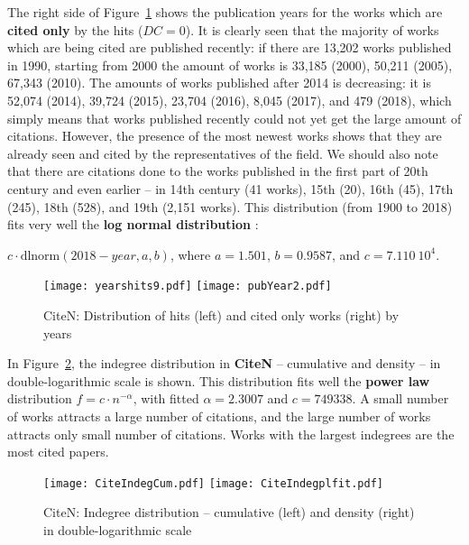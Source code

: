 \documentclass[11pt]{article} %
\begin{document}
The right side of Figure~\ref{yeard} shows the publication years for the works which are \textbf{cited only} by the hits ($DC=0$). It is clearly seen that the majority of works which are being cited are published recently: if there are 13,202 works published in 1990, starting from 2000 the amount of works is 33,185 (2000), 50,211 (2005), 67,343 (2010). The amounts of works published after 2014 is decreasing: it is 52,074 (2014), 39,724 (2015),  23,704 (2016), 8,045 (2017), and 479 (2018), which simply means that works published recently could not yet get the large amount of citations. However, the presence of the most newest works shows that they are already seen and cited by the representatives of the field. We should also note that there are citations done to the works published in the first part of 20th century and even earlier -- in 14th century (41 works), 15th (20), 16th (45), 17th (245), 18th (528), and 19th (2,151 works). This distribution (from 1900 to 2018) fits very well the \textbf{log normal distribution} \cite[p.~119--121]{Understand}: \smallskip 

$c\cdot \mbox{dlnorm}(2018-year,a,b)$, where $a = 1.501$, $b = 0.9587$, and $c = 7.110\ 10^4$.\medskip

\begin{figure}
\centerline{
\texttt{[image: yearshits9.pdf]} \qquad
\texttt{[image: pubYear2.pdf]} }
\caption{CiteN: Distribution of hits (left) and cited only works (right) by years}\label{yeard}
\end{figure}
\medskip   

In Figure~\ref{cindeg}, the indegree distribution in \textbf{CiteN} -- cumulative and density -- in double-logarithmic scale is shown. This distribution fits well the \textbf{power law} distribution $f = c \cdot n^{-\alpha}$, with fitted $\alpha = 2.3007$ and $c=749338$. A small number of works attracts a large number of citations, and the large number of works attracts only small number of citations. Works with the largest indegrees are the most cited papers. 

\begin{figure}
\centerline{
\texttt{[image: CiteIndegCum.pdf]} \qquad 
\texttt{[image: CiteIndegplfit.pdf]} } 
\caption{CiteN: Indegree distribution -- cumulative (left) and density (right) in double-logarithmic scale}\label{cindeg}
\end{figure}
\medskip    
\end{document}
